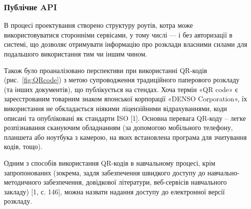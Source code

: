 \subsubsection{Публічне API}

В процесі проектування створено структуру роутів, котра може використовуватися сторонніми сервісами, у тому числі — і без авторизації в системі, що дозволяє отримувати інформацію про розклади власними силами для подальшого використання тим чи іншим чином. 

Також було проаналізовано перспективи при використанні QR-кодів (рис.~\ref{fig:QRcode}) з метою супроводження традиційного паперового розкладу (та інших документів), що публікується на стендах. Хоча термін «QR code» є зареєстрованим товарним знаком японської корпорації «DENSO Corporation», їх використання не обкладається ніякими ліцензійними відрахуваннями, коди описані та опубліковані як стандарти ISO [1]. Основна перевага QR-коду – легке розпізнавання скануючим обладнанням (за допомогою мобільного телефону, планшета або ноутбука з камерою, на яких встановлена програма для зчитування кодів, тощо).

Одним з способів використання QR-кодів в навчальному процесі, крім запропонованих (зокрема, задля забезпечення швидкого доступу до навчально-методичного забезпечення, довідкової літератури, веб-сервісів навчального закладу) [1, с. 146],  можна назвати надання доступу до електронної версії розкладу.
